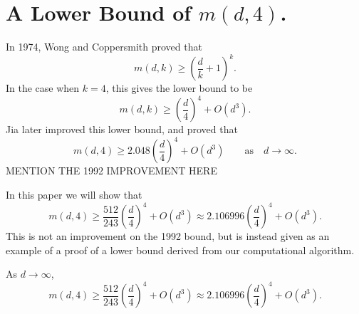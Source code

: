 \section{ A Lower Bound of $m(d, 4)$.}
In 1974, Wong and Coppersmith proved that
\[m(d, k) \geq \left (\frac{d}{k} + 1\right)^k.\]
In the case when $k = 4$, this gives the lower bound to be
\[m(d, k) \geq \left (\frac{d}{4}\right )^4 + O(d^3).\]
Jia later improved this lower bound, and proved that 
\[ 
m(d, 4) \geq2.048 \left(\frac{d}{4}\right)^4  +O(d^3)\qquad\text{as}\quad d\to\infty.
\]
MENTION THE 1992 IMPROVEMENT HERE

In this paper we will show that \[m(d,4) \geq \frac{512}{243}\left(\frac d4\right)^4 + O(d^3)\approx 2.106996 \left(\frac d4\right)^4 + O(d^3).\]  This is not an improvement on the 1992 bound, but is instead given as an example of a proof of a lower bound derived from our computational algorithm.
\begin{theorem} As $d\to\infty$, 
\[
m(d,4) \geq \frac{512}{243}\left(\frac d4\right)^4 + O(d^3)\approx 2.106996 \left(\frac d4\right)^4 + O(d^3).
\]
\end{theorem}

